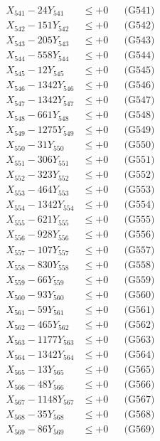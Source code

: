 \documentclass[a4paper,10pt]{article}
\begin{document}
{\begin{align}
\allowbreak
X_{541} - 24Y_{541} &\leq +0 && \text{(G541)} \\
X_{542} - 151Y_{542} &\leq +0 && \text{(G542)} \\
X_{543} - 205Y_{543} &\leq +0 && \text{(G543)} \\
X_{544} - 558Y_{544} &\leq +0 && \text{(G544)} \\
X_{545} - 12Y_{545} &\leq +0 && \text{(G545)} \\
X_{546} - 1342Y_{546} &\leq +0 && \text{(G546)} \\
X_{547} - 1342Y_{547} &\leq +0 && \text{(G547)} \\
X_{548} - 661Y_{548} &\leq +0 && \text{(G548)} \\
X_{549} - 1275Y_{549} &\leq +0 && \text{(G549)} \\
X_{550} - 31Y_{550} &\leq +0 && \text{(G550)} \\
\allowbreak
X_{551} - 306Y_{551} &\leq +0 && \text{(G551)} \\
X_{552} - 323Y_{552} &\leq +0 && \text{(G552)} \\
X_{553} - 464Y_{553} &\leq +0 && \text{(G553)} \\
X_{554} - 1342Y_{554} &\leq +0 && \text{(G554)} \\
X_{555} - 621Y_{555} &\leq +0 && \text{(G555)} \\
X_{556} - 928Y_{556} &\leq +0 && \text{(G556)} \\
X_{557} - 107Y_{557} &\leq +0 && \text{(G557)} \\
X_{558} - 830Y_{558} &\leq +0 && \text{(G558)} \\
X_{559} - 66Y_{559} &\leq +0 && \text{(G559)} \\
X_{560} - 93Y_{560} &\leq +0 && \text{(G560)} \\
\allowbreak
X_{561} - 59Y_{561} &\leq +0 && \text{(G561)} \\
X_{562} - 465Y_{562} &\leq +0 && \text{(G562)} \\
X_{563} - 1177Y_{563} &\leq +0 && \text{(G563)} \\
X_{564} - 1342Y_{564} &\leq +0 && \text{(G564)} \\
X_{565} - 13Y_{565} &\leq +0 && \text{(G565)} \\
X_{566} - 48Y_{566} &\leq +0 && \text{(G566)} \\
X_{567} - 1148Y_{567} &\leq +0 && \text{(G567)} \\
X_{568} - 35Y_{568} &\leq +0 && \text{(G568)} \\
X_{569} - 86Y_{569} &\leq +0 && \text{(G569)} \\

\end{align}}
\end{document}
